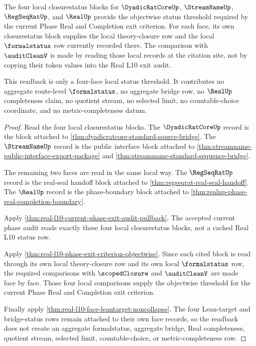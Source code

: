 \begin{theorem}
\label{thm:real-l10-local-face-record-readback}
The four local closurestatus blocks for $\DyadicRatCoreUp$,
$\StreamNameUp$, $\RegSeqRatUp$, and $\RealUp$ provide the objectwise status
threshold required by the current Phase Real and Completion exit criterion. For
each face, its own closurestatus block supplies the local theory-closure row and
the local $\formalstatus$ row currently recorded there. The comparison with
$\auditCleanV$ is made by reading those local records at the citation site, not
by copying their token values into the Real L10 exit audit.

This readback is only a four-face local status threshold. It contributes no
aggregate route-level $\formalstatus$, no aggregate bridge row, no $\RealUp$
completeness claim, no quotient stream, no selected limit, no countable-choice
coordinate, and no metric-completeness datum.
\end{theorem}
\begin{proof}
Read the four local closurestatus blocks. The $\DyadicRatCoreUp$ record is the
block attached to \autoref{thm:dyadicratcore-standard-source-bridge}. The
$\StreamNameUp$ record is the public interface block attached to
\autoref{thm:streamname-public-interface-export-package} and
\autoref{thm:streamname-standard-sequence-bridge}.

The remaining two faces are read in the same local way. The $\RegSeqRatUp$
record is the real-seal handoff block attached to
\autoref{thm:regseqrat-real-seal-handoff}. The $\RealUp$ record is the
phase-boundary block attached to
\autoref{thm:realup-phase-real-completion-boundary}.

Apply \autoref{thm:real-l10-current-phase-exit-audit-pullback}. The accepted
current phase audit reads exactly these four local closurestatus blocks, not a
cached Real L10 status row.

Apply \autoref{thm:real-l10-phase-exit-criterion-objectwise}. Since
each cited block is read through its own local theory-closure row and its own
local $\formalstatus$ row, the required comparisons with $\scopedClosure$ and
$\auditCleanV$ are made face by face. Those four local comparisons supply the
objectwise threshold for the current Phase Real and Completion exit criterion.

Finally apply \autoref{thm:real-l10-face-leantarget-noncollapse}. The four
Lean-target and bridge-status rows remain attached to their own face records,
so the readback does not create an aggregate formalstatus, aggregate bridge,
Real completeness, quotient stream, selected limit, countable-choice, or
metric-completeness row.
\end{proof}

